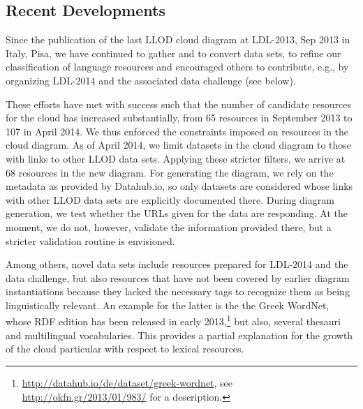 \subsection{Recent Developments}

Since the publication of the last LLOD cloud diagram at LDL-2013, Sep 2013 in Italy, Pisa, we have continued to gather and to convert data sets, to refine our classification of language resources and encouraged others to contribute, e.g., by organizing LDL-2014 and the associated data challenge (see below).

These efforts have met with success such that the number of candidate resources for the cloud has increased substantially, from 65 resources in September 2013 to 107 in April 2014. 
We thus enforced the constraints imposed on resources in the cloud diagram. As of April 2014, we limit datasets in the cloud diagram to those with links to other LLOD data sets. 
Applying these stricter filters, we arrive at 68 resources in the new diagram.
For generating the diagram, we rely on the metadata as provided by Datahub.io, so only datasets are considered whose links with other LLOD data sets are explicitly documented there.
During diagram generation, we test whether the URLs given for the data are responding. At the moment, we do not, however, validate the information provided there, but a stricter validation routine is envisioned. 

Among others, novel data sets include resources prepared for LDL-2014 and the data challenge, but also resources that have not been covered by earlier diagram instantiations because they lacked the necessary tags to recognize them as being linguistically relevant. An example for the latter is the the Greek WordNet, whose RDF edition has been released in early 2013,\footnote{
	\url{http://datahub.io/de/dataset/greek-wordnet}, see \url{http://okfn.gr/2013/01/983/} for a description.
}
but also, several thesauri and multilingual vocabularies.
This provides a partial explanation for the growth of the cloud particular with respect to lexical resources. 

